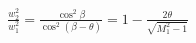 \documentclass[10pt]{article}
\begin{document}
\begin{align*}\frac{w_{2}^{2}}{w_{1}^{2}}
=
\frac{ \cos^2 \beta }{ \cos^2 \left( \beta - \theta \right) }
=
1 - \frac{2 \theta }{\sqrt{M_{1}^{2} - 1}}\end{align*}
\end{document}
